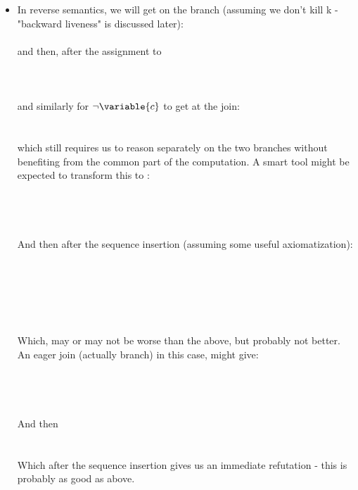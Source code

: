 \begin{itemize}
\begin{itemize}
		\item In reverse semantics, we will get on the  branch (assuming we don't kill k - "backward liveness" is discussed later):
			 \\
			 \\
			and then, after the assignment to  \\
			 \\
			 \\
			 \\
			and similarly for $\lnot \variable{c}$ to get at the join: \\
			 \\
			 \\
			which still requires us to reason separately on the two branches without benefiting from the common part of the computation.
			A smart tool might be expected to transform this to : \\
			 \\
			 \\
			 \\
			 \\
			And then after the sequence insertion (assuming some useful axiomatization): \\
			 \\
			 \\
			 \\
			 \\
			 \\
			 \\
			Which, may or may not be worse than the above, but probably not better.\\
			An eager join (actually branch) in this case, might give: \\
			 \\
			 \\
			 \\
			 \\
			And then \\
			 \\
			 \\
			Which after the sequence insertion gives us an immediate refutation - this is probably as good as above.
		\end{itemize}


\end{itemize}
